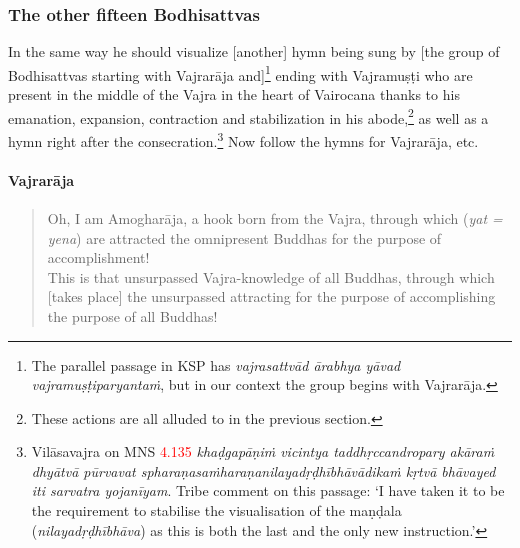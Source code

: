 \documentclass[11pt]{book}
\newcommand{\red}[1]{\textcolor{red}{#1}}
\newcommand{\skt}[1]{\emph{#1}}
\begin{document}
\subsubsection{The other fifteen Bodhisattvas}

In the same way he should visualize [another] hymn being sung by [the group of Bodhisattvas starting with Vajrarāja and]\footnote{The parallel passage in KSP has \skt{vajrasattvād ārabhya yāvad vajramuṣṭiparyantaṁ}, but in our context the group begins with Vajrarāja.} ending with Vajramuṣṭi who are present in the middle of the Vajra in the heart of Vairocana thanks to his emanation, expansion, contraction and stabilization in his abode,\footnote{These actions are all alluded to in the previous section.} as well as a hymn right after the consecration.\footnote{Vilāsavajra on MNS \red{4.135} \skt{khaḍgapāṇiṁ vicintya taddhṛccandropary akāraṁ dhyātvā pūrvavat spharaṇasaṁharaṇanilayadṛḍhībhāvādikaṁ kṛtvā bhāvayed iti sarvatra yojanīyam}. Tribe comment on this passage: `I have taken it to be the requirement to stabilise the visualisation of the maṇḍala (\skt{nilayadṛḍhībhāva}) as this is both the last and the only new instruction.'} Now follow the hymns for Vajrarāja, etc.

\paragraph{Vajrarāja}

\begin{verse}
Oh, I am Amogharāja, a hook born from the Vajra, through which (\skt{yat = yena}) are attracted the omnipresent Buddhas for the purpose of accomplishment!\\
This is that unsurpassed Vajra-knowledge of all Buddhas, through which [takes place] the unsurpassed attracting for the purpose of accomplishing the purpose of all Buddhas!
\end{verse}
\end{document}
